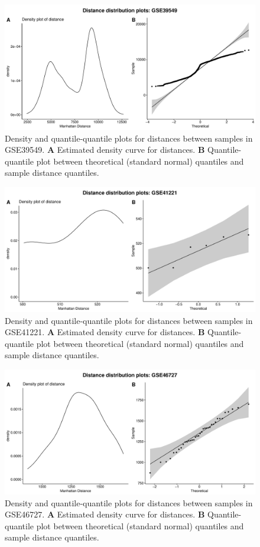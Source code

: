 \documentclass[10pt,letterpaper]{article}\usepackage[]{graphicx}\usepackage[]{color}
\begin{document}
\begin{figure}[H]
	\includegraphics[width=\textwidth]{manhattan-distance_hist_GSE39549.pdf}
	\caption{Density and quantile-quantile plots for distances between samples in GSE39549. \textbf{A} Estimated density curve for distances. \textbf{B} Quantile-quantile plot between theoretical (standard normal) quantiles and sample distance quantiles.}
\end{figure}

\begin{figure}[H]
	\includegraphics[width=\textwidth]{manhattan-distance_hist_GSE41221.pdf}
	\caption{Density and quantile-quantile plots for distances between samples in GSE41221. \textbf{A} Estimated density curve for distances. \textbf{B} Quantile-quantile plot between theoretical (standard normal) quantiles and sample distance quantiles.}
\end{figure}

\begin{figure}[H]
	\includegraphics[width=\textwidth]{manhattan-distance_hist_GSE46727.pdf}
	\caption{Density and quantile-quantile plots for distances between samples in GSE46727. \textbf{A} Estimated density curve for distances. \textbf{B} Quantile-quantile plot between theoretical (standard normal) quantiles and sample distance quantiles.}
\end{figure}
\end{document}
